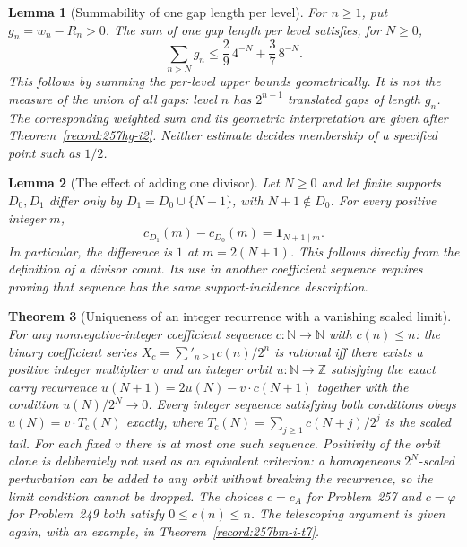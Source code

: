\documentclass[11pt]{article}
\theoremstyle{plain}
\newtheorem{thm}{Theorem}[section]
\newtheorem{lem}[thm]{Lemma}
\theoremstyle{definition}
\theoremstyle{remark}
\begin{document}
\begin{lem}[Summability of one gap length per level]
\label{lem:gap-mass-summability}
For $n\ge1$, put $g_n=w_n-R_n>0$.  The sum of one gap
length per level satisfies, for $N\ge0$,
\[
 \sum_{n>N}g_n\le\frac29\,4^{-N}+\frac37\,8^{-N}.
\]
This follows by summing the per-level upper bounds geometrically.
It is not the measure of the union of all gaps: level $n$ has
$2^{n-1}$ translated gaps of length $g_n$.  The corresponding weighted
sum and its geometric interpretation are given after
Theorem~\ref{record:257hg-i2}.  Neither estimate decides membership
of a specified point such as $1/2$.
\end{lem}

\begin{lem}[The effect of adding one divisor]
\label{lem:half-divisor-unit-drop}
Let $N\ge0$ and let finite supports $D_0,D_1$ differ only by
$D_1=D_0\cup\{N+1\}$, with $N+1\notin D_0$.
For every positive integer $m$,
\[
 c_{D_1}(m)-c_{D_0}(m)=\mathbf1_{N+1\mid m}.
\]
In particular, the difference is $1$ at $m=2(N+1)$.
This follows directly from the definition of a divisor count.
Its use in another coefficient sequence requires proving that
sequence has the same support-incidence description.
\end{lem}

\begin{thm}[Uniqueness of an integer recurrence with a vanishing scaled limit]
\label{thm:tempered-orbit-rigidity}
For any nonnegative-integer coefficient sequence $c:\mathbb N\to\mathbb N$ with $c(n)\le
n$: the binary coefficient series $X_c = \sum'_{n\ge 1} c(n)/2^n$ is rational iff there
exists a positive integer multiplier $v$ and an integer orbit $u:\mathbb N\to\mathbb Z$
satisfying the exact carry recurrence $u(N{+}1)=2u(N)-v\cdot c(N{+}1)$ together with the
condition $u(N)/2^N\to0$.  Every integer sequence satisfying both conditions obeys $u(N) = v\cdot T_c(N)$ exactly, where $T_c(N)=\sum_{j\ge 1} c(N{+}j)/2^j$ is
the scaled tail.  For each fixed $v$ there is at most one such sequence. Positivity of the orbit alone
is deliberately \emph{not} used as an equivalent criterion: a homogeneous $2^N$-scaled
perturbation can be added to any orbit without breaking the recurrence, so the limit condition cannot be dropped.  The choices $c=c_A$ for
Problem~257 and $c=\varphi$ for Problem~249 both satisfy $0\le c(n)\le n$.
The telescoping argument is given again, with an example, in
Theorem~\ref{record:257bm-i-t7}.
\end{thm}
\end{document}
